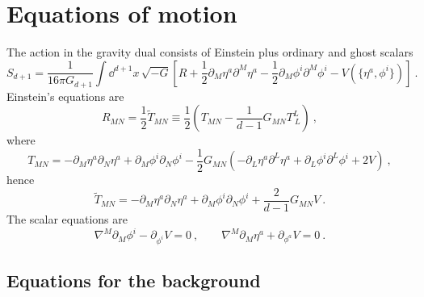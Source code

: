 \section{Equations of motion}\label{app:eoms}

The action in the gravity dual consists of Einstein plus ordinary and ghost scalars
\begin{equation}
	S_{d+1}=\frac{1}{16\pi G_{d+1}}\int \dd^{d+1} x\, \sqrt{-G}\left[R+\frac{1}{2}\partial_M \eta^a\partial^M\eta^a-\frac{1}{2}\partial_M \phi^i\partial^M\phi^i-V\left(\{\eta^a,\phi^i\}\right)\right]\ .
\end{equation}
Einstein's equations are
\begin{equation}
	R_{MN}=\frac{1}{2}\widetilde T_{MN}\equiv \frac{1}{2}\left(T_{MN}-\frac{1}{d-1}G_{MN}T^L_{\ L} \right)\ ,
\end{equation}
where
\begin{equation}
	T_{MN}=-\partial_M \eta^a\partial_N\eta^a+\partial_M \phi^i\partial_N\phi^i-\frac{1}{2}G_{MN}\left( -\partial_L \eta^a\partial^L\eta^a+\partial_L \phi^i\partial^L\phi^i+2V\right)\ ,
\end{equation}
hence
\begin{equation}
	\widetilde T_{MN}=-\partial_M \eta^a\partial_N\eta^a+\partial_M \phi^i\partial_N\phi^i+\frac{2}{d-1}G_{MN}V\ .
\end{equation}
The scalar equations are
\begin{equation}
	\nabla^M\partial_M\phi^i-\partial_{\phi^i}V=0
	\ ,\qquad \nabla^M\partial_M\eta^a+\partial_{\phi^a}V=0\ .
\end{equation}

\subsection{Equations for the background}

